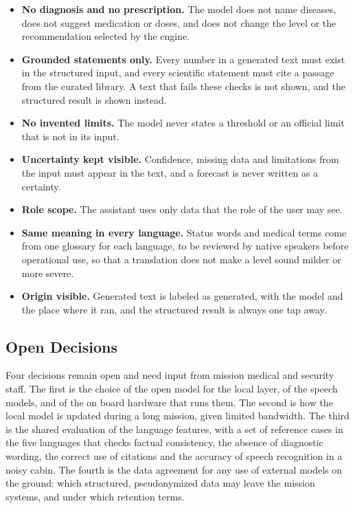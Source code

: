 \begin{itemize}
\item \textbf{No diagnosis and no prescription.} The model does not name diseases, does not suggest medication or doses, and does not change the level or the recommendation selected by the engine.
\item \textbf{Grounded statements only.} Every number in a generated text must exist in the structured input, and every scientific statement must cite a passage from the curated library. A text that fails these checks is not shown, and the structured result is shown instead.
\item \textbf{No invented limits.} The model never states a threshold or an official limit that is not in its input.
\item \textbf{Uncertainty kept visible.} Confidence, missing data and limitations from the input must appear in the text, and a forecast is never written as a certainty.
\item \textbf{Role scope.} The assistant uses only data that the role of the user may see.
\item \textbf{Same meaning in every language.} Status words and medical terms come from one glossary for each language, to be reviewed by native speakers before operational use, so that a translation does not make a level sound milder or more severe.
\item \textbf{Origin visible.} Generated text is labeled as generated, with the model and the place where it ran, and the structured result is always one tap away.
\end{itemize}

\subsection{Open Decisions}
\label{subsec:ai-open-decisions}

Four decisions remain open and need input from mission medical and security staff. The first is the choice of the open model for the local layer, of the speech models, and of the on board hardware that runs them. The second is how the local model is updated during a long mission, given limited bandwidth. The third is the shared evaluation of the language features, with a set of reference cases in the five languages that checks factual consistency, the absence of diagnostic wording, the correct use of citations and the accuracy of speech recognition in a noisy cabin. The fourth is the data agreement for any use of external models on the ground: which structured, pseudonymized data may leave the mission systems, and under which retention terms.
